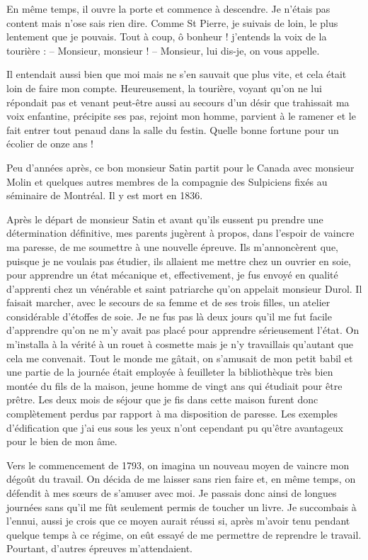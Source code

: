 \documentclass[11pt,a4paper]{report}
\begin{document}
En même temps, il ouvre la porte et commence à descendre. Je n'étais pas content mais n'ose sais rien dire. Comme St Pierre, je suivais de loin, le plus lentement que je pouvais. Tout à coup, ô bonheur ! j'entends la voix de la tourière :
-- Monsieur, monsieur !
-- Monsieur, lui dis-je, on vous appelle.

Il entendait aussi bien que moi mais ne s'en sauvait que plus vite, et cela était loin de faire mon compte. Heureusement, la tourière, voyant qu'on ne lui répondait pas et venant peut-être aussi au secours d'un désir que trahissait ma voix enfantine, précipite ses pas, rejoint mon homme, parvient à le ramener et le fait entrer tout penaud dans la salle du festin. Quelle bonne fortune pour un écolier de onze ans !

Peu d'années après, ce bon monsieur Satin partit pour le Canada avec monsieur Molin et quelques autres membres de la compagnie des Sulpiciens fixés au séminaire de Montréal. Il y est mort en 1836.

Après le départ de monsieur Satin et avant qu'ils eussent pu prendre une détermination définitive, mes parents jugèrent à propos, dans l'espoir de vaincre ma paresse, de me soumettre à une nouvelle épreuve. Ils m'annoncèrent que, puisque je ne voulais pas étudier, ils allaient me mettre chez un ouvrier en soie, pour apprendre un état mécanique et, effectivement, je fus envoyé en qualité d'apprenti chez un vénérable et saint patriarche qu'on appelait monsieur Durol. Il faisait marcher, avec le secours de sa femme et de ses trois filles, un atelier considérable d'étoffes de soie. Je ne fus pas là deux jours qu'il me fut facile d'apprendre qu'on ne m'y avait pas placé pour apprendre sérieusement l'état. On m'installa à la vérité à un rouet à cosmette mais je n'y travaillais qu'autant que cela me convenait. Tout le monde me gâtait, on s'amusait de mon petit babil et une partie de la journée était employée à feuilleter la bibliothèque très bien montée du fils de la maison, jeune homme de vingt ans qui étudiait pour être prêtre. Les deux mois de séjour que je fis dans cette maison furent donc complètement perdus par rapport à ma disposition de paresse. Les exemples d'édification que j'ai eus sous les yeux n'ont cependant pu qu'être avantageux pour le bien de mon âme.

Vers le commencement de 1793, on imagina un nouveau moyen de vaincre mon dégoût du travail. On décida de me laisser sans rien faire et, en même temps, on défendit à mes sœurs de s'amuser avec moi. Je passais donc ainsi de longues journées sans qu'il me fût seulement permis de toucher un livre. Je succombais à l'ennui, aussi je crois que ce moyen aurait réussi si, après m'avoir tenu pendant quelque temps à ce régime, on eût essayé de me permettre de reprendre le travail. Pourtant, d'autres épreuves m'attendaient.
\end{document}
